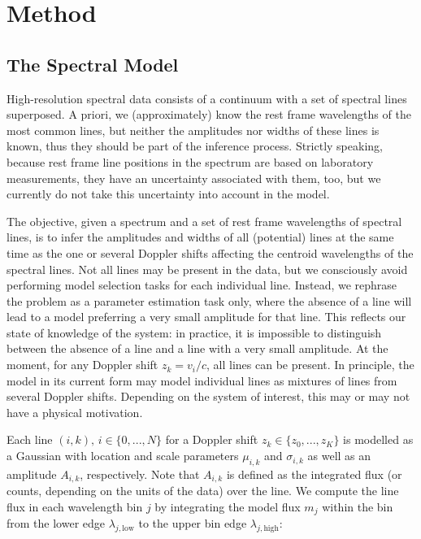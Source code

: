 \documentclass[12pt]{emulateapj}
\newcommand{\mean}{m}
\begin{document}
\section{Method}

\subsection{The Spectral Model}
\label{sec:spectralmodel}

High-resolution spectral data consists of a continuum with a set of spectral lines superposed. A priori, we (approximately) know the rest frame wavelengths of the most common lines, but neither the amplitudes nor widths of these lines is known, thus they should be part of the inference process. Strictly speaking, because rest frame line positions in the spectrum are based on laboratory measurements, they have an uncertainty associated with them, too, but we currently do not take this uncertainty into account in the model.

The objective, given a spectrum and a set of rest frame wavelengths of spectral lines, is to infer the amplitudes and widths of all (potential) lines at the same time as the one or several Doppler shifts affecting the centroid wavelengths of the spectral lines. Not all lines may be present in the data, but we consciously avoid performing model selection tasks for each individual line. Instead, we rephrase the problem as a parameter estimation task only, where the absence of a line will lead to a model preferring a very small amplitude for that line. This reflects our state of knowledge of the system: in practice, it is impossible to distinguish between the absence of a line and a line with a very small amplitude.
At the moment, for any Doppler shift $z_k = v_i/c$, all lines can be present. In principle, the model in its current form may model individual lines as mixtures of lines from several Doppler shifts. Depending on the system of interest, this may or may not have a physical motivation. 

Each line $(i,k), \, i \in \{0, ..., N\}$ for a Doppler shift $z_k \in \{z_0, ..., z_K\}$ is modelled as a Gaussian with location and scale parameters $\mu_{i,k}$ and $\sigma_{i,k}$ as well as an amplitude $A_{i,k}$, respectively. Note that $A_{i,k}$ is defined as the integrated flux (or counts, depending on the units of the data) over the line. We compute the line flux in each wavelength bin $j$ by integrating the model flux $\mean_j$ within the bin from the lower edge $\lambda_{j, \mathrm{low}}$ to the upper bin edge $\lambda_{j, \mathrm{high}}$:
\end{document}
